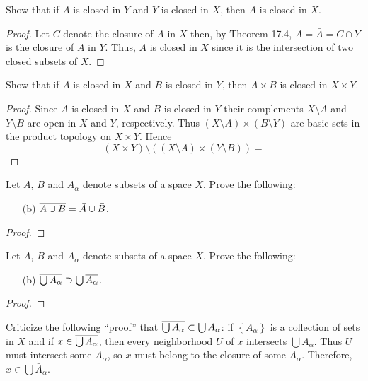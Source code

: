 \begin{problem}[Munkres \S17, p.\,100, 2]
Show that if $A$ is closed in $Y$ and $Y$ is closed in $X$, then
$A$ is closed in $X$.
\end{problem}
\begin{proof}
Let $C$ denote the closure of $A$ in $X$ then, by Theorem 17.4,
$A=\bar A=C\cap Y$ is the closure of $A$ in $Y$. Thus, $A$ is
closed in $X$ since it is the intersection of two closed subsets
of $X$.
\end{proof}
\newpage
\begin{problem}[Munkres \S17, p.\,100, 3]
Show that if $A$ is closed in $X$ and $B$ is closed in $Y$, then
$A\times B$ is closed in $X\times Y$.
\end{problem}
\begin{proof}
Since $A$ is closed in $X$ and $B$ is closed in $Y$ their
complements $X\setminus A$ and $Y\setminus B$ are open in $X$ and
$Y$, respectively. Thus $(X\setminus A)\times (B\setminus Y)$ are
basic sets in the product topology on $X\times Y$. Hence
\[
(X\times Y)\setminus\left((X\setminus A)\times(Y\setminus
  B)\right)
=
\]
\end{proof}
\newpage
\begin{problem}[Munkres \S17, p.\,101, 6(b)]
Let $A$, $B$ and $A_\alpha$ denote subsets of a space $X$. Prove
the following:
\begin{enumerate}[noitemsep]
\item[(b)] $\overline{A\cup B}=\bar A\cup\bar B$.
\end{enumerate}
\end{problem}
\begin{proof}
\end{proof}
\newpage
\begin{problem}[Munkres \S17, p.\,101, 6(c)]
Let $A$, $B$ and $A_\alpha$ denote subsets of a space $X$. Prove
the following:
\begin{enumerate}[noitemsep]
\item[(b)] $\overline{\bigcup A_\alpha}\supset\bigcup\overline{A_\alpha}$.
\end{enumerate}
\end{problem}
\begin{proof}
\end{proof}
\newpage
\begin{problem}[Munkres \S17, p.\,101, 7]
Criticize the following ``proof'' that $\overline{\bigcup
  A_\alpha}\subset\bigcup\bar A_\alpha$: if
$\left\{A_\alpha\right\}$ is a collection of sets in $X$ and if
$x\in\overline{\bigcup A_\alpha}$, then every neighborhood $U$ of $x$
intersects $\bigcup A_\alpha$. Thus $U$ must intersect some
$A_\alpha$, so $x$ must belong to the closure of some
$A_\alpha$. Therefore, $x\in\bigcup\bar A_\alpha$.
\end{problem}
